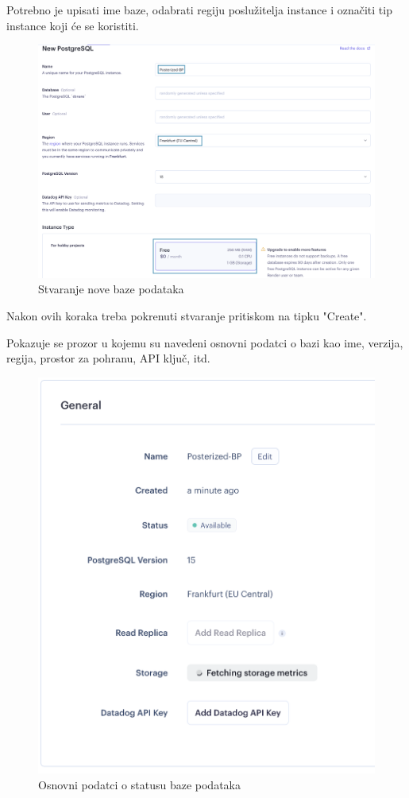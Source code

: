 			Potrebno je upisati ime baze, odabrati regiju poslužitelja instance i označiti tip instance koji će se koristiti.
			\begin{figure}[H]
				\includegraphics[scale=0.3]{slike/deploy/database2.png} %
				\centering
				\caption{Stvaranje nove baze podataka}
				\label{fig:promjene}
			\end{figure}
			Nakon ovih koraka treba pokrenuti stvaranje pritiskom na tipku "Create".
			
			Pokazuje se prozor u kojemu su navedeni osnovni podatci o bazi kao ime, verzija, regija, prostor za pohranu, API ključ, itd.
			\begin{figure}[H]
				\includegraphics[scale=0.3]{slike/deploy/database3.png} %
				\centering
				\caption{Osnovni podatci o statusu baze podataka}
				\label{fig:promjene}
			\end{figure}
			
